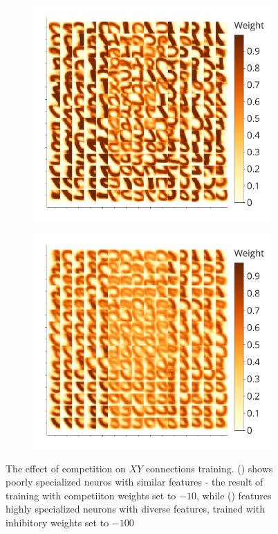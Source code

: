 \documentclass[a4paper,10pt]{article}
\begin{document}
\begin{figure}[H]
\centering
\begin{subfigure}{0.45\textwidth}
    \includegraphics[width=\textwidth,keepaspectratio=true]{weights_XY_good.pdf}
    \caption{}
    \label{fig:competition_effect_on_training:high_comp}
\end{subfigure}
\begin{subfigure}{0.45\textwidth}
    \includegraphics[width=\textwidth,keepaspectratio=true]{weights_XY_bad.pdf} 
    \caption{}
    \label{fig:competition_effect_on_training:low_comp}
\end{subfigure}
\caption{The effect of competition on $ XY $ connections training. () shows poorly specialized neuros with similar features - the result of training with competiiton weights set to $-10$, while () features highly specialized neurons with diverse features, trained with inhibitory weights set to $-100$}
\label{competition-training-importance}
\end{figure}
\end{document}
